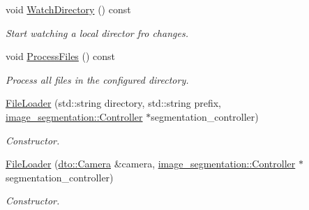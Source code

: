 \begin{DoxyCompactItemize}
\item 
\mbox{\label{classimage__acquisition_1_1_file_loader_adeb64eae0fff91eae7ef4217c544c026}} 
void \mbox{\hyperlink{classimage__acquisition_1_1_file_loader_adeb64eae0fff91eae7ef4217c544c026}{Watch\+Directory}} () const
\begin{DoxyCompactList}\small\item\em Start watching a local director fro changes. \end{DoxyCompactList}\item 
\mbox{\label{classimage__acquisition_1_1_file_loader_abe302f9b626376389fc7acb8b0fd0749}} 
void \mbox{\hyperlink{classimage__acquisition_1_1_file_loader_abe302f9b626376389fc7acb8b0fd0749}{Process\+Files}} () const
\begin{DoxyCompactList}\small\item\em Process all files in the configured directory. \end{DoxyCompactList}\item 
\mbox{\label{classimage__acquisition_1_1_file_loader_af39cde17cfa4402c04ced704d4d521c7}} 
\mbox{\hyperlink{classimage__acquisition_1_1_file_loader_af39cde17cfa4402c04ced704d4d521c7}{File\+Loader}} (std\+::string directory, std\+::string prefix, \mbox{\hyperlink{classimage__segmentation_1_1_controller}{image\+\_\+segmentation\+::\+Controller}} $\ast$segmentation\+\_\+controller)
\begin{DoxyCompactList}\small\item\em Constructor. \end{DoxyCompactList}\item 
\mbox{\label{classimage__acquisition_1_1_file_loader_afc3589ac9b1fcb214a46024137b0d100}} 
\mbox{\hyperlink{classimage__acquisition_1_1_file_loader_afc3589ac9b1fcb214a46024137b0d100}{File\+Loader}} (\mbox{\hyperlink{structdto_1_1_camera}{dto\+::\+Camera}} \&camera, \mbox{\hyperlink{classimage__segmentation_1_1_controller}{image\+\_\+segmentation\+::\+Controller}} $\ast$segmentation\+\_\+controller)
\begin{DoxyCompactList}\small\item\em Constructor. \end{DoxyCompactList}\item 

\end{DoxyCompactItemize}
